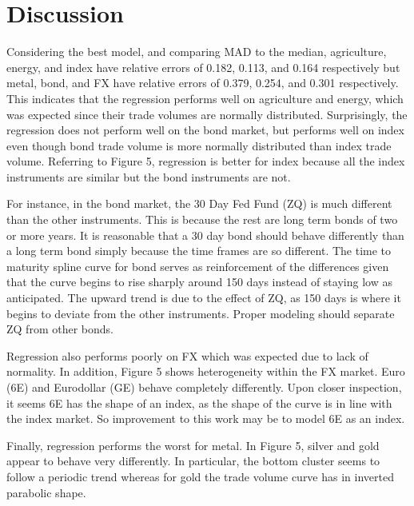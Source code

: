 \documentclass[12pt]{article}
\begin{document}
\section*{Discussion} 
Considering the best model, and comparing MAD to the median, agriculture, energy, and index have relative errors of 0.182, 0.113, and 0.164 respectively but metal, bond, and FX have relative errors of 0.379, 0.254, and 0.301 respectively. This indicates that the regression performs well on agriculture and energy, which was expected since their trade volumes are normally distributed. Surprisingly, the regression does not perform well on the bond market, but performs well on index even though bond trade volume is more normally distributed than index trade volume. Referring to Figure 5, regression is better for index because all the index instruments are similar but the bond instruments are not.

For instance, in the bond market, the 30 Day Fed Fund (ZQ) is much different than the other instruments. This is because the rest are long term bonds of two or more years. It is reasonable that a 30 day bond should behave differently than a long term bond simply because the time frames are so different. The time to maturity spline curve for bond serves as reinforcement of the differences given that the curve begins to rise sharply around 150 days instead of staying low as anticipated. The upward trend is due to the effect of ZQ, as 150 days is where it begins to deviate from the other instruments. Proper modeling should separate ZQ from other bonds. 

Regression also performs poorly on FX which was expected due to lack of normality. In addition, Figure 5 shows heterogeneity within the FX market. Euro (6E) and Eurodollar (GE) behave completely differently. Upon closer inspection, it seems 6E has the shape of an index, as the shape of the curve is in line with the index market. So improvement to this work may be to model 6E as an index.

Finally, regression performs the worst for metal. In Figure 5, silver and gold appear to behave very differently. In particular, the bottom cluster seems to follow a periodic trend whereas for gold the trade volume curve has in inverted parabolic shape.
\end{document}
